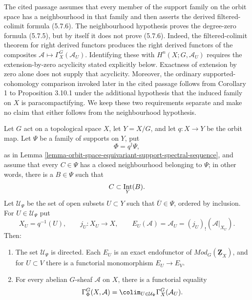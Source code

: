 \begin{lemma}
\label{lemma-equivariant-support-filtered-extension-by-zero}
\begin{reference}
\cite[Chapter V, \S 5.7, formulae (5.7.5) and (5.7.6),
p. 220]{Tohoku}
\end{reference}
\begin{history}
The cited passage assumes that every member of the support family on the
orbit space has a neighbourhood in that family and then asserts the derived
filtered-colimit formula (5.7.6). The neighbourhood hypothesis proves the
degree-zero formula (5.7.5), but by itself it does not prove (5.7.6).
Indeed, the filtered-colimit theorem for right derived functors produces
the right derived functors of the composites
$\mathcal A\mapsto\Gamma_X^G(\mathcal A_U)$. Identifying these with
$H^n(X;G,\mathcal A_U)$ requires the extension-by-zero acyclicity stated
explicitly below. Exactness of extension by zero alone does not supply that
acyclicity. Moreover, the ordinary supported-cohomology comparison invoked
later in the cited passage follows from Corollary 1 to Proposition 3.10.1
under the additional hypothesis that the induced family on $X$ is
paracompactifying. We keep these two requirements separate and make no
claim that either follows from the neighbourhood hypothesis.
\end{history}
Let $G$ act on a topological space $X$, let $Y=X/G$, and let
$q:X\to Y$ be the orbit map. Let $\Psi$ be a family of supports on $Y$,
put
$$
\Phi=q^\dagger\Psi,
$$
as in Lemma
\ref{lemma-orbit-space-equivariant-support-spectral-sequence}, and assume
that every $C\in\Psi$ has a closed neighbourhood belonging to $\Psi$; in
other words, there is a $B\in\Psi$ such that
$$
C\subset\mathop{\rm Int}_Y(B).
$$
Let $\mathcal U_\Psi$ be the set of open subsets $U\subset Y$ such that
$\overline U\in\Psi$, ordered by inclusion. For $U\in\mathcal U_\Psi$ put
$$
X_U=q^{-1}(U),\qquad j_U:X_U\longrightarrow X,
\qquad
E_U(\mathcal A)=\mathcal A_U=(j_U)_!(\mathcal A|_{X_U}).
$$
Then:
\begin{enumerate}
\item The set $\mathcal U_\Psi$ is directed. Each $E_U$ is an exact
endofunctor of $\textit{Mod}_G(\underline{\mathbf Z}_X)$, and for
$U\subset V$ there is a functorial monomorphism
$E_U\to E_V$.
\item For every abelian $G$-sheaf $\mathcal A$ on $X$, there is a
functorial equality
$$
\Gamma^G_\Phi(X,\mathcal A)
=
\colim_{U\in\mathcal U_\Psi}\Gamma_X^G(\mathcal A_U).
$$
\end{enumerate}
\end{lemma}
